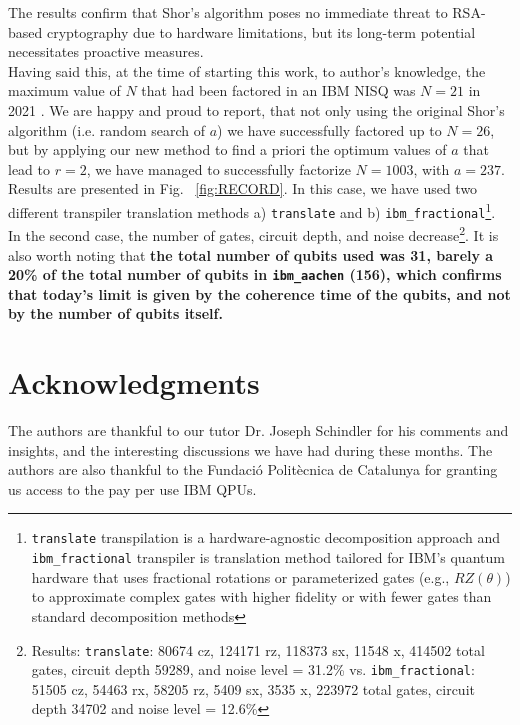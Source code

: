 \documentclass[conference,twoside]{IEEEtran}
\begin{document}
The results confirm that Shor's algorithm poses no immediate threat to RSA-based cryptography due to hardware limitations, but its long-term potential necessitates proactive measures. 
\\
Having said this, at the time of starting this work, to author's knowledge, the maximum value of $N$ that had been factored in an IBM NISQ was $N=21$ in 2021 \citep*{Karamlou2021}. We are happy and proud to report, that not only using the original Shor's algorithm (i.e. random search of $a$) we have successfully factored up to $N=26$, but by applying our new method to find a priori the optimum values of $a$ that lead to $r=2$, we have managed to successfully factorize $N=1003$, with $a=237$. Results are presented in Fig. ~\ref{fig:RECORD}. In this case, we have used two different transpiler translation methods a) \texttt{translate} and b) \texttt{ibm\_fractional}\footnote{\texttt{translate} transpilation is a hardware-agnostic decomposition approach and \texttt{ibm\_fractional} transpiler is translation method tailored for IBM’s quantum hardware that uses fractional rotations or parameterized gates (e.g., $ RZ(\theta) $) to approximate complex gates with higher fidelity or with fewer gates than standard decomposition methods}. In the second case, the number of gates,  circuit depth, and noise decrease\footnote{Results: \texttt{translate}: 80674 cz, 124171 rz, 118373 sx, 11548 x, 414502 total gates, circuit depth 59289, and noise level = 31.2\% vs. \texttt{ibm\_fractional}: 51505 cz, 54463 rx, 58205 rz, 5409 sx, 3535 x, 223972 total gates, circuit depth 34702 and noise level = 12.6\%}. It is also worth noting that \textbf{the total number of qubits used was 31, barely a 20\% of the total number of qubits in \texttt{ibm\_aachen} (156), which confirms that today's limit is given by the coherence time of the qubits, and not by the number of qubits itself.}

\section*{Acknowledgments}
The authors are thankful to our tutor Dr. Joseph Schindler for his comments and insights, and the interesting discussions we have had during these months. The authors are also thankful to the Fundació Politècnica de Catalunya for granting us access to the pay per use IBM QPUs.
\end{document}
